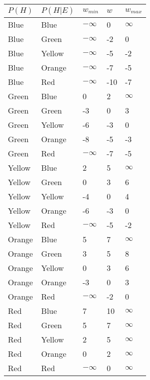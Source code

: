 \documentclass[
]{article}
\begin{document}
\begin{longtable}[]{@{}lllll@{}}
\toprule\noalign{}
\(P(H)\) & \(P(H|E)\) & \(w_{min}\) & \(w\) & \(w_{max}\) \\
\midrule\noalign{}
\endhead
\bottomrule\noalign{}
\endlastfoot
Blue & Blue & \(-\infty\) & 0 & \(\infty\) \\
Blue & Green & \(-\infty\) & -2 & 0 \\
Blue & Yellow & \(-\infty\) & -5 & -2 \\
Blue & Orange & \(-\infty\) & -7 & -5 \\
Blue & Red & \(-\infty\) & -10 & -7 \\
Green & Blue & 0 & 2 & \(\infty\) \\
Green & Green & -3 & 0 & 3 \\
Green & Yellow & -6 & -3 & 0 \\
Green & Orange & -8 & -5 & -3 \\
Green & Red & \(-\infty\) & -7 & -5 \\
Yellow & Blue & 2 & 5 & \(\infty\) \\
Yellow & Green & 0 & 3 & 6 \\
Yellow & Yellow & -4 & 0 & 4 \\
Yellow & Orange & -6 & -3 & 0 \\
Yellow & Red & \(-\infty\) & -5 & -2 \\
Orange & Blue & 5 & 7 & \(\infty\) \\
Orange & Green & 3 & 5 & 8 \\
Orange & Yellow & 0 & 3 & 6 \\
Orange & Orange & -3 & 0 & 3 \\
Orange & Red & \(-\infty\) & -2 & 0 \\
Red & Blue & 7 & 10 & \(\infty\) \\
Red & Green & 5 & 7 & \(\infty\) \\
Red & Yellow & 2 & 5 & \(\infty\) \\
Red & Orange & 0 & 2 & \(\infty\) \\
Red & Red & \(-\infty\) & 0 & \(\infty\) \\
\end{longtable}
\end{document}
